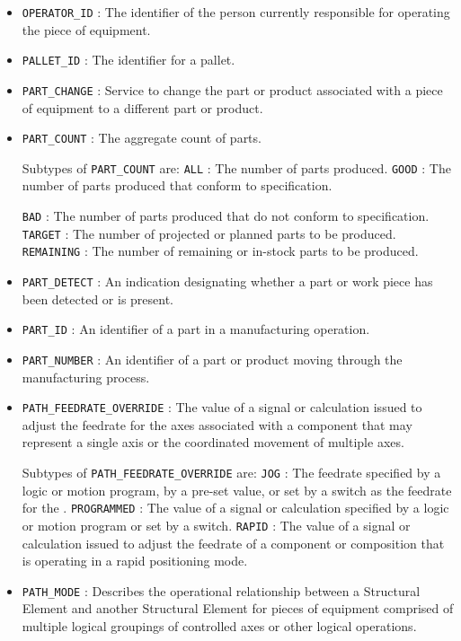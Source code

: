 \begin{itemize}
\item \texttt{OPERATOR_ID} : The identifier of the person currently responsible for operating the piece of equipment. 

\item \texttt{PALLET_ID} : The identifier for a pallet. 

\item \texttt{PART_CHANGE} : Service to change the part or product associated with a piece of equipment to a different part or product. 

\item \texttt{PART_COUNT} : The aggregate count of parts. 

Subtypes of \texttt{PART_COUNT} are: 
\newline\tab \texttt{ALL} : The number of parts produced.  
\newline\tab \texttt{GOOD} : The number of parts produced that conform to specification.
 
\newline\tab \texttt{BAD} : The number of parts produced that do not conform to specification. 
\newline\tab \texttt{TARGET} : The number of projected or planned parts to be produced. 
\newline\tab \texttt{REMAINING} : The number of remaining or in-stock parts to be produced. 
\item \texttt{PART_DETECT} : An indication designating whether a part or work piece has been detected or is present. 

\item \texttt{PART_ID} : An identifier of a part in a manufacturing operation. 

\item \texttt{PART_NUMBER} : An identifier of a part or product moving through the manufacturing process. 

\item \texttt{PATH_FEEDRATE_OVERRIDE} : The value of a signal or calculation issued to adjust the feedrate for the axes associated with a  component that may represent a single axis or the coordinated movement of multiple axes. 

Subtypes of \texttt{PATH_FEEDRATE_OVERRIDE} are: 
\newline\tab \texttt{JOG} : The feedrate specified by a logic or motion program, by a pre-set value, or set by a switch as the feedrate for the .  
\newline\tab \texttt{PROGRAMMED} : The value of a signal or calculation specified by a logic or motion program or set by a switch. 
\newline\tab \texttt{RAPID} : The value of a signal or calculation issued to adjust the feedrate of a component or composition that is operating in a rapid positioning mode. 
\item \texttt{PATH_MODE} : Describes the operational relationship between a  \gls{Structural Element} and another  \gls{Structural Element} for pieces of equipment comprised of multiple logical groupings of controlled axes or other logical operations. 


\end{itemize}
